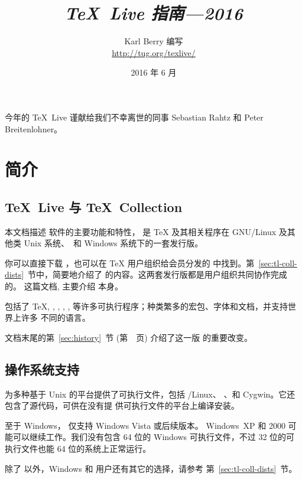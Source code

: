 \documentclass{article}
\title{%
  {\huge \textit{\TeX\ Live 指南---2016}}%
}
\author{Karl Berry 编写 \\[3mm]
        \url{http://tug.org/texlive/}
       }
\date{2016 年 6 月}
\begin{document}
\maketitle

\begin{center}
今年的 \TeX\ Live 谨献给我们不幸离世的同事 Sebastian Rahtz 和 Peter Breitenlohner。
\end{center}

\begin{multicols}{2}
\tableofcontents
\end{multicols}

\section{简介}
\label{sec:intro}

\subsection{\TeX\ Live 与 \TeX\ Collection}

本文档描述 \TL{} 软件的主要功能和特性，\TL{} 是 \TeX{} 及其相关程序在
GNU/Linux 及其他类 Unix 系统、\MacOSX\ 和 Windows
系统下的一套发行版。

你可以直接下载 \TL{}，也可以在 \TeX{} 用户组织给会员分发的 \TK{}
\DVD 中找到。第~\ref{sec:tl-coll-dists}~节中，简要地介绍了
\DVD 的内容。这两套发行版都是用户组织共同协作完成的。
这篇文档, 主要介绍 \TL{} 本身。

\TL{} 包括了 \TeX{}, \LaTeXe{}, \ConTeXt, \MF, \MP, \BibTeX{}
等许多可执行程序；种类繁多的宏包、字体和文档，并支持世界上许多
不同的语言。

文档末尾的第~\ref{sec:history}~节 (第~\pageref{sec:history}~页)
介绍了这一版 \TL{} 的重要改变。

\subsection{操作系统支持}
\label{sec:os-support}

\TL{} 为多种基于 Unix 的平台提供了可执行文件，包括 \GNU/Linux、
\MacOSX{}、和 Cygwin。它还包含了源代码，可供在没有提
供可执行文件的平台上编译安装。

至于 Windows，\TL{} 仅支持 Windows Vista 或后续版本。
Windows~XP 和 2000 可能可以继续工作。我们没有包含 64 位的 Windows
可执行文件，不过 32 位的可执行文件也能 64 位的系统上正常运行。

除了 \TL{} 以外，Windows 和 \MacOSX 用户还有其它的选择，请参考
第~\ref{sec:tl-coll-dists}~节。
\end{document}
